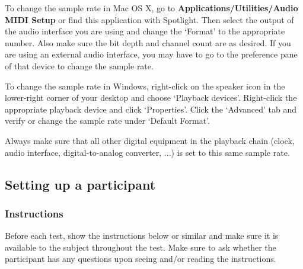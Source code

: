 \documentclass[11pt, oneside]{article}   	%
\begin{document}
		To change the sample rate in Mac OS X, go to \textbf{Applications/Utilities/Audio MIDI Setup} or find this application with Spotlight. Then select the output of the audio interface you are using and change the `Format' to the appropriate number. Also make sure the bit depth and channel count are as desired. 
		If you are using an external audio interface, you may have to go to the preference pane of that device to change the sample rate. 
		
		To change the sample rate in Windows, right-click on the speaker icon in the lower-right corner of your desktop and choose `Playback devices'. Right-click the appropriate playback device and click `Properties'. Click the `Advanced' tab and verify or change the sample rate under `Default Format'.    %
		
		Always make sure that all other digital equipment in the playback chain (clock, audio interface, digital-to-analog converter, ...) is set to this same sample rate. 
				
		
	\subsection{Setting up a participant}
		
		\subsubsection{Instructions} %
			Before each test, show the instructions below or similar and make sure it is available to the subject throughout the test. Make sure to ask whether the participant has any questions upon seeing and/or reading the instructions. 
			
\end{document}
